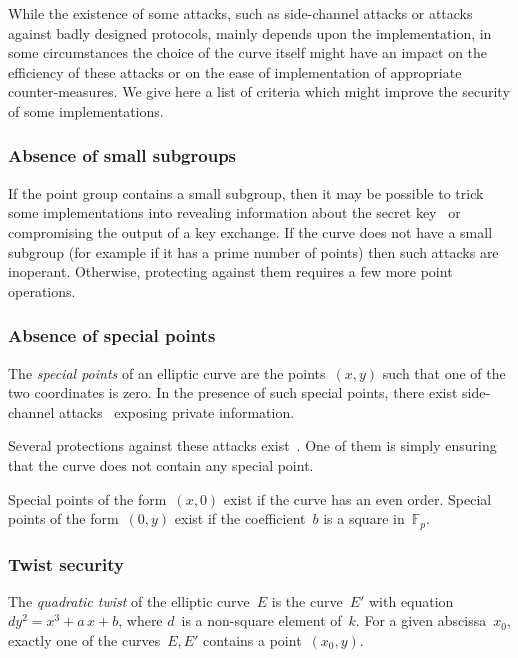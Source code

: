 \documentclass[twocolumn,letterpaper,10pt]{article}
\def\F{\mathbb{F}}
\begin{document}
While the existence of some attacks,
such as side-channel attacks or attacks against badly designed protocols,
mainly depends upon the implementation,
in some circumstances the choice of the curve itself
might have an impact on the efficiency of these attacks
or on the ease of implementation of appropriate counter-measures.
We give here a list of criteria
which might improve the security
of some implementations.

\subsubsection{Absence of small subgroups}
\label{sss:small-subgroup}

If the point group contains a small subgroup,
then it may be possible to trick some implementations
into revealing information about the secret key~\cite{crypto1997ll}
or compromising the output of a key exchange.
If the curve does not have a small subgroup
(for example if it has a prime number of points)
then such attacks are inoperant.
Otherwise, protecting against them requires a few more point operations.

\subsubsection{Absence of special points}
\label{sss:special-points}

The \emph{special points} of an elliptic curve
are the points~$(x,y)$ such that one of the two coordinates is zero.
In the presence of such special points,
there exist side-channel attacks~\cite{pkc2003goubin}
exposing private information.

Several protections against these attacks exist~\cite{ches2004mmm}.
One of them is simply ensuring that the curve does not contain
any special point.

Special points of the form~$(x, 0)$ exist if the curve has
an even order.
Special points of the form~$(0, y)$ exist if the coefficient~$b$
is a square in~$\F_p$.

\subsubsection{Twist security}
\label{sss:twist}

The \emph{quadratic twist} of the elliptic curve~$E$
is the curve~$E'$ with equation~$d y^2 = x^3 + a\,x + b$,
where $d$~is a non-square element of~$k$.
For a given abscissa~$x_0$,
exactly one of the curves~$E, E'$ contains a point~$(x_0, y)$.
\end{document}
